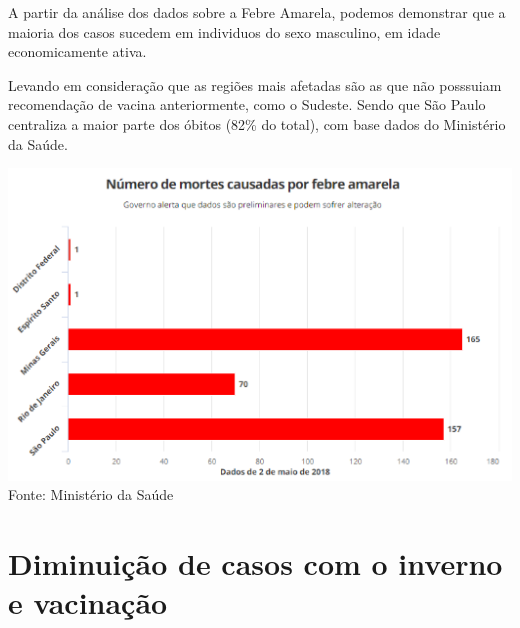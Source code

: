 \documentclass{article}
\begin{document}
\begin{multicols*}{2}
{	A partir da análise dos dados sobre a Febre Amarela, podemos demonstrar  que a maioria dos casos sucedem em individuos do sexo masculino, em idade economicamente ativa.
    
	Levando em consideração que as regiões mais afetadas  são as que não posssuiam recomendação de vacina anteriormente, como o Sudeste.
Sendo que São Paulo centraliza a maior parte dos óbitos (82\% do total), com base dados do Ministério da Saúde.
}%

	\includegraphics[width=.5\textwidth]{img_alteravel_boletim_ep.png}
{\small Fonte: Ministério da Saúde} %




\section*{Diminuição de casos com o inverno e vacinação} %

   {\large %
   
}
\end{multicols*}
\end{document}
